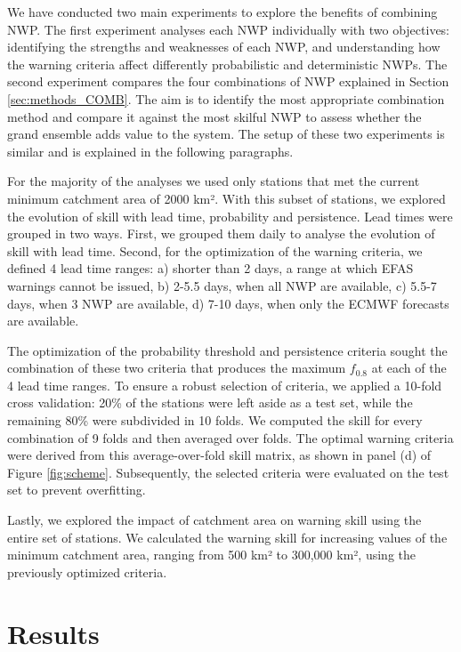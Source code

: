 \documentclass{ametsocV6.1}
\begin{document}
We have conducted two main experiments to explore the benefits of combining NWP. The first experiment analyses each NWP individually with two objectives: identifying the strengths and weaknesses of each NWP, and understanding how the warning criteria affect differently probabilistic and deterministic NWPs. The second experiment compares the four combinations of NWP explained in Section \ref{sec:methods_COMB}. The aim is to identify the most appropriate combination method and compare it against the most skilful NWP to assess whether the grand ensemble adds value to the system. The setup of these two experiments is similar and is explained in the following paragraphs.

For the majority of the analyses we used only stations that met the current minimum catchment area of 2000 km². With this subset of stations, we explored the evolution of skill with lead time, probability and persistence. Lead times were grouped in two ways. First, we grouped them daily to analyse the evolution of skill with lead time. Second, for the optimization of the warning criteria, we defined 4 lead time ranges: a) shorter than 2 days, a range at which EFAS warnings cannot be issued, b) 2-5.5 days, when all NWP are available, c) 5.5-7 days, when 3 NWP are available, d) 7-10 days, when only the ECMWF forecasts are available.

The optimization of the probability threshold and persistence criteria sought the combination of these two criteria that produces the maximum $f_{0.8}$ at each of the 4 lead time ranges. To ensure a robust selection of criteria, we applied a 10-fold cross validation: 20\% of the stations were left aside as a test set, while the remaining 80\% were subdivided in 10 folds. We computed the skill for every combination of 9 folds and then averaged over folds. The optimal warning criteria were derived from this average-over-fold skill matrix, as shown in panel (d) of Figure \ref{fig:scheme}. Subsequently, the selected criteria were evaluated on the test set to prevent overfitting. 

Lastly, we explored the impact of catchment area on warning skill using the entire set of stations. We calculated the warning skill for increasing values of the minimum catchment area, ranging from 500 km² to 300,000 km², using the previously optimized criteria.

\section{Results}
\label{sec:results}
\end{document}
